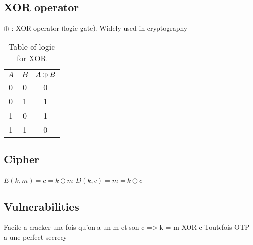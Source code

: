 \subsection{XOR operator}

$\oplus$ : XOR operator (logic gate). Widely used in cryptography

\begin{table}[ht!]
	\centering
		\begin{tabular}{c|c|c}
			$A$ & $B$ & $A\oplus B$ \\
			\hline
			0 & 0 & 0 \\
			0 & 1 & 1 \\
			1 & 0 & 1 \\
			1 & 1 & 0 \\
			\hline 
		\end{tabular}
	\caption{Table of logic for XOR}
	\label{tab:TableOfLogicForXOR}
\end{table}


\subsection{Cipher}
	$ E(k,m) = c = k \oplus m $ 
	$ D(k,c ) = m = k \oplus c$
	
	
\subsection{Vulnerabilities}

Facile a cracker une fois qu'on a un m et son c => k = m XOR c
Toutefois OTP a une perfect secrecy




